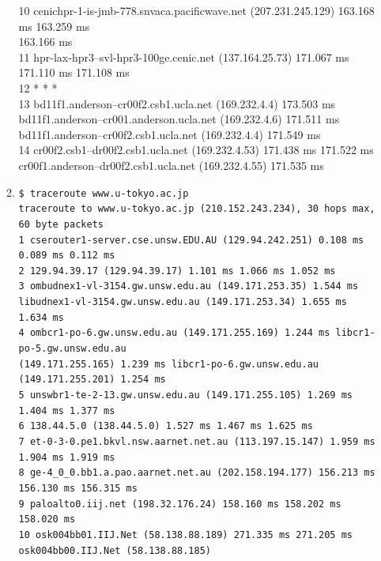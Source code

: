\documentclass[a4paper,11pt]{article}
\newcommand{\code}{\texttt}
\begin{document}
\begin{enumerate}[leftmargin=*]
\begin{enumerate}
{			10  cenichpr-1-is-jmb-778.snvaca.pacificwave.net (207.231.245.129)  163.168 ms  163.259 ms\\
			163.166 ms\\
			11  hpr-lax-hpr3--svl-hpr3-100ge.cenic.net (137.164.25.73)  171.067 ms  171.110 ms  171.108 ms\\
			12  * * *\\
			13  bd11f1.anderson--cr00f2.csb1.ucla.net (169.232.4.4)  173.503 ms\\
			bd11f1.anderson--cr001.anderson.ucla.net (169.232.4.6)  171.511 ms\\
			bd11f1.anderson--cr00f2.csb1.ucla.net (169.232.4.4)  171.549 ms\\
			14  cr00f2.csb1--dr00f2.csb1.ucla.net (169.232.4.53)  171.438 ms  171.522 ms\\
			cr00f1.anderson--dr00f2.csb1.ucla.net (169.232.4.55)  171.535 ms\\}
		\item \code{\scriptsize \$ traceroute www.u-tokyo.ac.jp\\
			traceroute to www.u-tokyo.ac.jp (210.152.243.234), 30 hops max, 60 byte packets\\
			 1  cserouter1-server.cse.unsw.EDU.AU (129.94.242.251)  0.108 ms  0.089 ms  0.112 ms\\
			 2  129.94.39.17 (129.94.39.17)  1.101 ms  1.066 ms  1.052 ms\\
			 3  ombudnex1-vl-3154.gw.unsw.edu.au (149.171.253.35)  1.544 ms\\
			 libudnex1-vl-3154.gw.unsw.edu.au (149.171.253.34)  1.655 ms  1.634 ms\\
			 4  ombcr1-po-6.gw.unsw.edu.au (149.171.255.169)  1.244 ms libcr1-po-5.gw.unsw.edu.au\\
			 (149.171.255.165)  1.239 ms libcr1-po-6.gw.unsw.edu.au (149.171.255.201)  1.254 ms\\
			 5  unswbr1-te-2-13.gw.unsw.edu.au (149.171.255.105)  1.269 ms  1.404 ms  1.377 ms\\
			 6  138.44.5.0 (138.44.5.0)  1.527 ms  1.467 ms  1.625 ms\\
			 7  et-0-3-0.pe1.bkvl.nsw.aarnet.net.au (113.197.15.147)  1.959 ms  1.904 ms  1.919 ms\\
			 8  ge-4\_0\_0.bb1.a.pao.aarnet.net.au (202.158.194.177)  156.213 ms  156.130 ms  156.315 ms\\
			 9  paloalto0.iij.net (198.32.176.24)  158.160 ms  158.202 ms  158.020 ms\\
			10  osk004bb01.IIJ.Net (58.138.88.189)  271.335 ms  271.205 ms osk004bb00.IIJ.Net (58.138.88.185)\\ 
}
\end{enumerate}
\end{enumerate}
\end{document}
